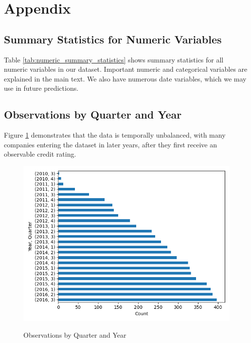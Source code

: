 \documentclass{article}[11pt]
\begin{document}
    \clearpage
    \newpage

    \appendix


    \section{Appendix}

    \subsection{Summary Statistics for Numeric Variables}

    Table \ref{tab:numeric_summary_statistics} shows summary statistics for all numeric variables in our dataset. Important numeric and categorical variables are explained in the main text. We also have numerous date variables, which we may use in future predictions.

    

    \clearpage
    \newpage

    \subsection{Observations by Quarter and Year}

    Figure \ref{fig:obs-by-quarter-year} demonstrates that the data is temporally unbalanced, with many companies entering the dataset in later years, after they first receive an observable credit rating.

    \begin{figure}[h!]
		\centering
        \caption{Observations by Quarter and Year}
        \includegraphics[width=0.6\linewidth,keepaspectratio=true]{../Output/All Data EDA/Tabular EDA/all_data_fixed_quarter_dates_obs_by_year_quarter_no_title.png}
        \label{fig:obs-by-quarter-year}
	\end{figure}
\end{document}
